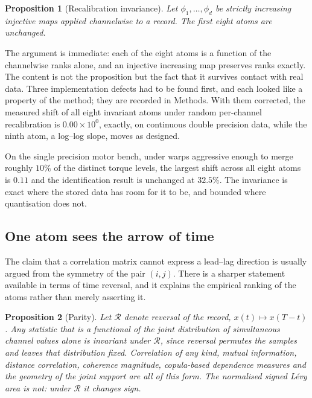 \documentclass[11pt]{article}
\newtheorem{proposition}{Proposition}
\begin{document}
\begin{proposition}[Recalibration invariance]
\label{prop:invariance}
Let $\phi_1,\dots,\phi_d$ be strictly increasing injective maps applied
channelwise to a record. The first eight atoms are unchanged.
\end{proposition}

The argument is immediate: each of the eight atoms is a function of the
channelwise ranks alone, and an injective increasing map preserves ranks
exactly. The content is not the proposition but the fact that it survives
contact with real data. Three implementation defects had to be found first, and
each looked like a property of the method; they are recorded in Methods. With
them corrected, the measured shift of all eight invariant atoms under random
per-channel recalibration is $0.00\times10^{0}$, exactly, on continuous double
precision data, while the ninth atom, a log--log slope, moves as designed.

On the single precision motor bench, under warps aggressive enough to merge
roughly $10\%$ of the distinct torque levels, the largest shift across all
eight atoms is $0.11$ and the identification result is unchanged at $32.5\%$.
The invariance is exact where the stored data has room for it to be, and
bounded where quantisation does not.

\subsection{One atom sees the arrow of time}

The claim that a correlation matrix cannot express a lead--lag direction is
usually argued from the symmetry of the pair $(i,j)$. There is a sharper
statement available in terms of time reversal, and it explains the empirical
ranking of the atoms rather than merely asserting it.

\begin{proposition}[Parity]
\label{prop:parity}
Let $\mathcal{R}$ denote reversal of the record, $x(t)\mapsto x(T-t)$. Any
statistic that is a functional of the joint distribution of simultaneous
channel values alone is invariant under $\mathcal{R}$, since reversal permutes
the samples and leaves that distribution fixed. Correlation of any kind,
mutual information, distance correlation, coherence magnitude, copula-based
dependence measures and the geometry of the joint support are all of this form.
The normalised signed L\'evy area is not: under $\mathcal{R}$ it changes sign.
\end{proposition}
\end{document}
